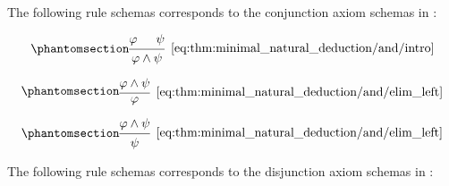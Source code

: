 \begin{proposition}
\begin{thmenum}
     The following rule schemas corresponds to the conjunction axiom schemas in :

    \begin{minipage}{0.3\textwidth}
      \begin{equation*}\taglabel[\textrm{R} \( \wedge^+ \)]{eq:thm:minimal_natural_deduction/and/intro}
        \begin{prooftree}
          \hypo{ \varphi }
          \hypo{ \psi }
          \infer2[\ref{eq:thm:minimal_natural_deduction/and/intro}]{ \varphi \wedge \psi }
        \end{prooftree}
      \end{equation*}
    \end{minipage}
    \hfill
    \begin{minipage}{0.3\textwidth}
      \begin{equation*}\taglabel[\textrm{R} \( \wedge_L^- \)]{eq:thm:minimal_natural_deduction/and/elim_left}
        \begin{prooftree}
          \hypo{ \varphi \wedge \psi }
          \infer1[\ref{eq:thm:minimal_natural_deduction/and/elim_left}]{ \varphi }
        \end{prooftree}
      \end{equation*}
    \end{minipage}
    \hfill
    \begin{minipage}{0.3\textwidth}
      \begin{equation*}\taglabel[\textrm{R} \( \wedge_R^- \)]{eq:thm:minimal_natural_deduction/and/elim_right}
        \begin{prooftree}
          \hypo{ \varphi \wedge \psi }
          \infer1[\ref{eq:thm:minimal_natural_deduction/and/elim_left}]{ \psi }
        \end{prooftree}
      \end{equation*}
    \end{minipage}

     The following rule schemas corresponds to the disjunction axiom schemas in :


\end{thmenum}
\end{proposition}
